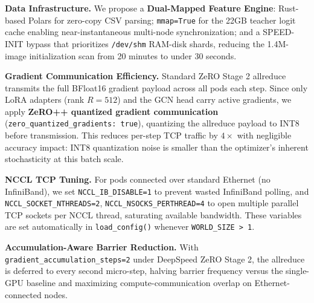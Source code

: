 \documentclass[10pt,twocolumn,letterpaper]{article}
\begin{document}
\textbf{Data Infrastructure.} We propose a \textbf{Dual-Mapped Feature Engine}: Rust-based Polars for zero-copy CSV parsing; \texttt{mmap=True} for the 22GB teacher logit cache enabling near-instantaneous multi-node synchronization; and a SPEED-INIT bypass that prioritizes \texttt{/dev/shm} RAM-disk shards, reducing the 1.4M-image initialization scan from 20 minutes to under 30 seconds.

\textbf{Gradient Communication Efficiency.} Standard ZeRO Stage 2 allreduce transmits the full BFloat16 gradient payload across all pods each step. Since only LoRA adapters (rank $R{=}512$) and the GCN head carry active gradients, we apply \textbf{ZeRO++ quantized gradient communication} (\texttt{zero\_quantized\_gradients: true}), quantizing the allreduce payload to INT8 before transmission. This reduces per-step TCP traffic by $4\times$ with negligible accuracy impact: INT8 quantization noise is smaller than the optimizer's inherent stochasticity at this batch scale.

\textbf{NCCL TCP Tuning.} For pods connected over standard Ethernet (no InfiniBand), we set \texttt{NCCL\_IB\_DISABLE=1} to prevent wasted InfiniBand polling, and \texttt{NCCL\_SOCKET\_NTHREADS=2}, \texttt{NCCL\_NSOCKS\_PERTHREAD=4} to open multiple parallel TCP sockets per NCCL thread, saturating available bandwidth. These variables are set automatically in \texttt{load\_config()} whenever \texttt{WORLD\_SIZE > 1}.

\textbf{Accumulation-Aware Barrier Reduction.} With \texttt{gradient\_accumulation\_steps=2} under DeepSpeed ZeRO Stage 2, the allreduce is deferred to every second micro-step, halving barrier frequency versus the single-GPU baseline and maximizing compute-communication overlap on Ethernet-connected nodes.
\end{document}
